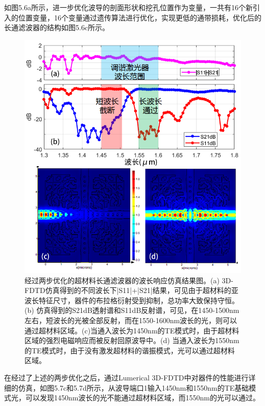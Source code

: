如图5.6a所示，进一步优化波导的剖面形状和挖孔位置作为变量，一共有16个新引入的位置变量，16个变量通过遗传算法进行优化，实现更低的通带损耗，优化后的长通滤波器的结构如图5.6c所示。

\begin{figure}[!htbp]
    \centering
    \includegraphics[width=1\textwidth]{Img/5-7.png}
    \caption{经过两步优化的超材料长通滤波器的波长响应仿真结果图。(a) 3D-FDTD仿真得到的不同波长下|S11|+|S21|结果，可见由于超材料的亚波长特征尺寸，器件的布拉格衍射受到抑制，总功率大致保持守恒。 (b) 仿真得到的S21dB透射谱和S11dB反射谱，可见，在1450-1500nm左右，短波长的光被全部反射，而在1550-1600nm波长的光，则可以通过超材料区域。(c)当通入波长为1450nm的TE模式时，由于超材料区域的强烈电磁响应而被反射回原波导中。(d) 当通入波长为1550nm的TE模式时，由于没有激发超材料的谐振模式，光可以通过超材料区域。}
    \label{fig:5-7}
\end{figure}

在经过了上述的两步优化之后，通过Lumerical 3D-FDTD中对器件的性能进行详细的仿真，如图5.7c和5.7d所示，从波导端口1输入1450nm和1550nm的TE基础模式光，可以发现1450nm波长的光不能通过超材料区域，而1550nm的光可以通过。

